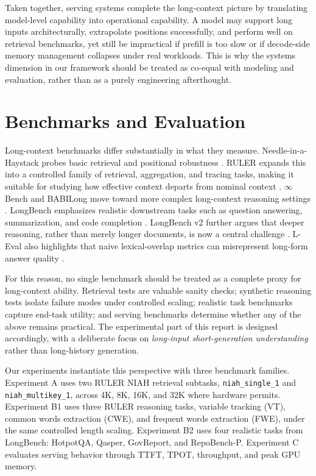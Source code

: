 \documentclass{article}
\begin{document}
Taken together, serving systems complete the long-context picture by translating model-level capability into operational capability. A model may support long inputs architecturally, extrapolate positions successfully, and perform well on retrieval benchmarks, yet still be impractical if prefill is too slow or if decode-side memory management collapses under real workloads. This is why the systems dimension in our framework should be treated as co-equal with modeling and evaluation, rather than as a purely engineering afterthought.

\section{Benchmarks and Evaluation}
\label{sec:evaluation}

Long-context benchmarks differ substantially in what they measure. Needle-in-a-Haystack probes basic retrieval and positional robustness \citep{liu2024lost}. RULER expands this into a controlled family of retrieval, aggregation, and tracing tasks, making it suitable for studying how effective context departs from nominal context \citep{hsieh2024ruler}. $\infty$Bench and BABILong move toward more complex long-context reasoning settings \citep{zhang2024infinitebench, kuratov2024babilong}. LongBench emphasizes realistic downstream tasks such as question answering, summarization, and code completion \citep{bai2024longbench}. LongBench v2 further argues that deeper reasoning, rather than merely longer documents, is now a central challenge \citep{bai2025longbenchv2}. L-Eval also highlights that naive lexical-overlap metrics can misrepresent long-form answer quality \citep{an2023leval}.

For this reason, no single benchmark should be treated as a complete proxy for long-context ability. Retrieval tests are valuable sanity checks; synthetic reasoning tests isolate failure modes under controlled scaling; realistic task benchmarks capture end-task utility; and serving benchmarks determine whether any of the above remains practical. The experimental part of this report is designed accordingly, with a deliberate focus on \emph{long-input short-generation understanding} rather than long-history generation.

Our experiments instantiate this perspective with three benchmark families. Experiment A uses two RULER NIAH retrieval subtasks, \texttt{niah\_single\_1} and \texttt{niah\_multikey\_1}, across 4K, 8K, 16K, and 32K where hardware permits. Experiment B1 uses three RULER reasoning tasks, variable tracking (VT), common words extraction (CWE), and frequent words extraction (FWE), under the same controlled length scaling. Experiment B2 uses four realistic tasks from LongBench: HotpotQA, Qasper, GovReport, and RepoBench-P. Experiment C evaluates serving behavior through TTFT, TPOT, throughput, and peak GPU memory.
\end{document}
